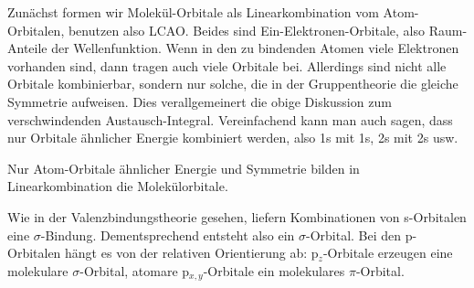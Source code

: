 Zunächst formen wir Molekül-Orbitale als Linearkombination vom Atom-Orbitalen, benutzen also LCAO. Beides sind Ein-Elektronen-Orbitale, also Raum-Anteile der Wellenfunktion. Wenn in den zu bindenden Atomen viele Elektronen vorhanden sind, dann tragen auch viele Orbitale bei.  Allerdings sind nicht alle Orbitale kombinierbar, sondern nur solche, die in der Gruppentheorie die gleiche Symmetrie aufweisen. Dies verallgemeinert die obige Diskussion zum verschwindenden Austausch-Integral. Vereinfachend kann man auch sagen, dass nur Orbitale ähnlicher Energie kombiniert werden, also 1s mit 1s, 2s mit 2s usw. 

\begin{marginfigure}
\centering

 \begin{modiagram}[labels, names, AO-width=6pt, distance=3cm]
 

    
\end{modiagram}
\caption{Nur Atom-Orbitale ähnlicher Energie und Symmetrie bilden in Linearkombination die Molekülorbitale. }
\end{marginfigure}



Wie in der Valenzbindungstheorie gesehen, liefern Kombinationen von s-Orbitalen eine $\sigma$-Bindung. Dementsprechend entsteht also ein $\sigma$-Orbital. Bei den p-Orbitalen hängt es von der relativen Orientierung ab: p$_z$-Orbitale erzeugen eine molekulare $\sigma$-Orbital, atomare p$_{x,y}$-Orbitale ein molekulares  $\pi$-Orbital. 


